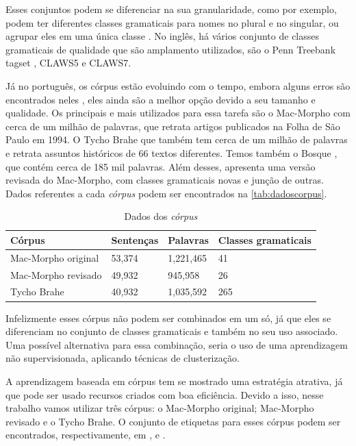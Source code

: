 Esses conjuntos podem se diferenciar na sua granularidade, como por exemplo, podem ter diferentes classes gramaticais para nomes no plural e no singular, ou agrupar eles em uma única classe \cite{fonseca2015evaluating}. No inglês, há vários conjunto de classes gramaticais de qualidade que são amplamento utilizados, são o Penn Treebank tagset \cite{penntreebank}, CLAWS5 e CLAWS7.

Já no português, os córpus estão evoluindo com o tempo, embora alguns erros são encontrados neles \cite{fonseca2013mac}, eles ainda são a melhor opção devido a seu tamanho e qualidade. Os principais e mais utilizados para essa tarefa são o Mac-Morpho \cite{aluisio2003account} com cerca de um milhão de palavras, que retrata artigos publicados na Folha de São Paulo em 1994. O Tycho Brahe \cite{temponi2004corpus} que também tem cerca de um milhão de palavras e retrata assuntos históricos de 66 textos diferentes. Temos também o Bosque \cite{afonso2002floresta}, que contém cerca de 185 mil palavras. Além desses, \cite{fonseca2015evaluating} apresenta uma versão revisada do Mac-Morpho, com classes gramaticais novas e junção de outras. Dados referentes a cada \textit{córpus} podem ser encontrados na \autoref{tab:dadoscorpus}.

\begin{table}[!htb]
\footnotesize
\centering
\caption{Dados dos \textit{córpus}}
\label{tab:dadoscorpus}
\begin{tabular}{m{4cm}m{2cm}m{2cm}m{4cm}}
  \toprule
  \textbf{Córpus} & \textbf{Sentenças}  & \textbf{Palavras}  & \textbf{Classes gramaticais}  \\
  \midrule
  Mac-Morpho original & 53,374 & 1,221,465 & 41  \\
  Mac-Morpho revisado & 49,932 & 945,958   & 26  \\
  Tycho Brahe         & 40,932 & 1,035,592 & 265 \\
  \bottomrule
\end{tabular}
\end{table}

Infelizmente esses córpus não podem ser combinados em um só, já que eles se diferenciam no conjunto de classes gramaticais e também no seu uso associado. Uma possível alternativa para essa combinação, seria o uso de uma aprendizagem não supervisionada, aplicando técnicas de clusterização.

A aprendizagem baseada em córpus tem se mostrado uma estratégia atrativa, já que pode ser usado recursos criados com boa eficiência. Devido a isso, nesse trabalho vamos utilizar três córpus: o Mac-Morpho original; Mac-Morpho revisado e o Tycho Brahe. O conjunto de etiquetas para esses córpus podem ser encontrados, respectivamente, em \cite{aluisio2003account}, \cite{fonseca2015evaluating} e \cite{temponi2004corpus}.




